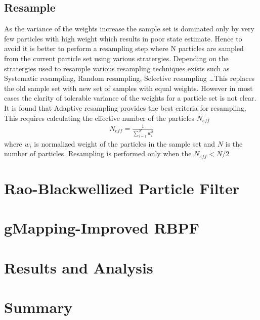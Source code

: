 \subsection{Resample}
As the variance of the weights increase the sample set is dominated only by very few particles with high weight which results in poor state estimate. Hence
to avoid it is better to perform a resampling step where N particles are sampled from the current particle set using various stratergies. Depending on the 
stratergies used to resample various resampling techniques exists such as Systematic resampling, Random resampling, Selective resampling \dots This replaces the 
old sample set with new set of samples with equal weights. However in most cases the clarity of tolerable variance of the weights for a particle set is not clear.
It is found that Adaptive resampling provides the best criteria for resampling. This requires calculating the effective number of the particles ${N_{eff}}$
\begin{gather} \label{Neff}
N_{eff} = \frac{1}{\sum_{i=1}^{N} w_{i}^{2} } 
\end{gather}
where ${w_{i}}$ is normalized weight of the particles in the sample set and ${N}$ is the number of particles.  Resampling is performed only 
when the ${N_{eff} < N/2}$
\section{Rao-Blackwellized Particle Filter}

\section{gMapping-Improved RBPF}

\section{Results and Analysis}

\section{Summary}